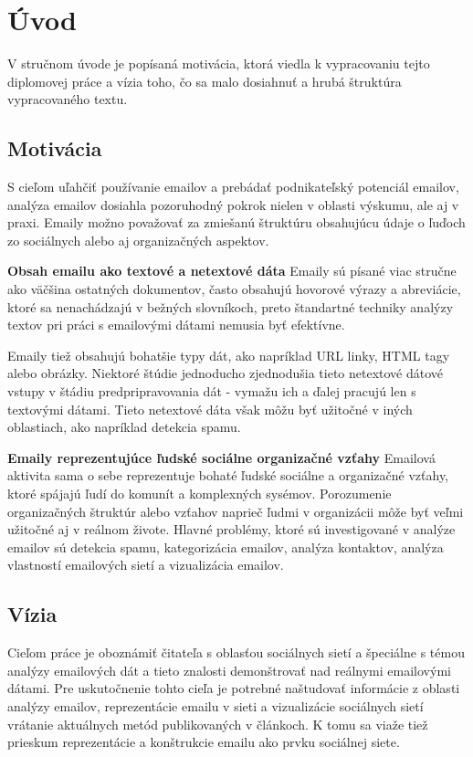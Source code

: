 \documentclass[slovak,master,public,dept460,male,cpdeclaration,oneside]{diploma}
\begin{document}
\MakeTitlePages


\section{Úvod}
V stručnom úvode je popísaná motivácia, ktorá viedla k vypracovaniu tejto diplomovej práce a vízia toho, čo sa malo dosiahnuť a hrubá štruktúra vypracovaného textu.

\subsection{Motivácia}
S cieľom uľahčiť používanie emailov a prebádať podnikateľský potenciál emailov, analýza emailov dosiahla pozoruhodný pokrok nielen v oblasti výskumu, ale aj v praxi. Emaily možno považovať za zmiešanú štruktúru obsahujúcu údaje o ľuďoch zo sociálnych alebo aj organizačných aspektov.

\textbf{Obsah emailu ako textové a netextové dáta} 
\newline Emaily sú písané viac stručne ako väčšina ostatných dokumentov, často obsahujú hovorové výrazy a abreviácie, ktoré sa nenachádzajú v bežných slovníkoch, preto štandartné techniky analýzy textov pri práci s emailovými dátami  nemusia byť efektívne.

Emaily tiež obsahujú bohatšie typy dát, ako napríklad URL linky, HTML tagy alebo obrázky. Niektoré štúdie jednoducho zjednodušia tieto netextové dátové vstupy v štádiu predpripravovania dát - vymažu ich a ďalej pracujú len s textovými dátami. Tieto netextové dáta však môžu byť užitočné v iných oblastiach, ako napríklad detekcia spamu. 


\textbf{Emaily reprezentujúce ľudské sociálne organizačné vzťahy} 
\newline Emailová aktivita sama o sebe reprezentuje bohaté ľudské sociálne a organizačné vzťahy, ktoré spájajú ľudí do komunít a komplexných sysémov. Porozumenie organizačných štruktúr alebo vzťahov naprieč ľudmi v organizácii môže byť veľmi užitočné aj v reálnom živote. 
Hlavné problémy, ktoré sú investigované v analýze emailov sú detekcia spamu, kategorizácia emailov, analýza kontaktov, analýza vlastností emailových sietí a vizualizácia emailov.

\subsection{Vízia}
Cieľom práce je oboznámiť čitateľa s oblasťou sociálnych sietí a špeciálne s témou analýzy emailových dát a tieto znalosti demonštrovať nad reálnymi emailovými dátami. Pre uskutočnenie tohto cieľa je potrebné naštudovať informácie z oblasti analýzy emailov, reprezentácie emailu v sieti a vizualizácie sociálnych sietí vrátanie aktuálnych metód publikovaných v článkoch. K tomu sa viaže tiež prieskum reprezentácie a konštrukcie emailu ako prvku sociálnej siete. 
\end{document}
